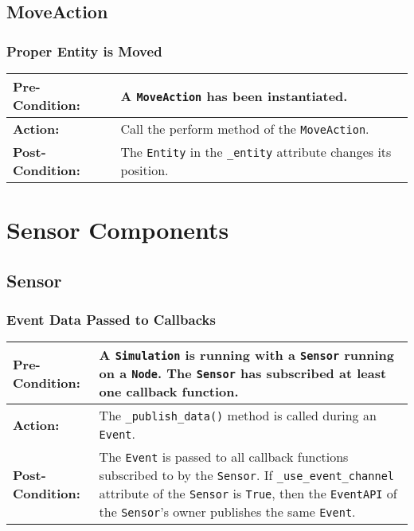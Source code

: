 \documentclass[titlepage]{article}
\newcommand{\testcase}[3]{
    \begin{center}
    \begin{tabular}{| l | p{0.7\textwidth}|}
        \hline
        \rowcolor[gray]{0.8}\textbf{Pre-Condition:} & #1 \\ \hline
        \textbf{Action:} & #2 \\ \hline
        \rowcolor[gray]{0.8}\textbf{Post-Condition:} & #3 \\ \hline
    \end{tabular}
    \end{center}
}
\begin{document}


\subsection{MoveAction}
\subsubsection{Proper Entity is Moved}
\testcase{A \texttt{MoveAction} has been instantiated.}{Call the perform method of the \texttt{MoveAction}.}{The \texttt{Entity} in the \texttt{\_entity} attribute changes its position.}

\section{Sensor Components}
\subsection{Sensor}
\subsubsection{Event Data Passed to Callbacks}
\testcase{A \texttt{Simulation} is running with a \texttt{Sensor} running on a \texttt{Node}. The \texttt{Sensor} has subscribed at least one callback function.}{The \texttt{\_publish\_data()} method is called during an \texttt{Event}.}{The \texttt{Event} is passed to all callback functions subscribed to by the \texttt{Sensor}. If \texttt{\_use\_event\_channel} attribute of the \texttt{Sensor} is \texttt{True}, then the \texttt{EventAPI} of the \texttt{Sensor}'s owner publishes the same \texttt{Event}.}
\end{document}
